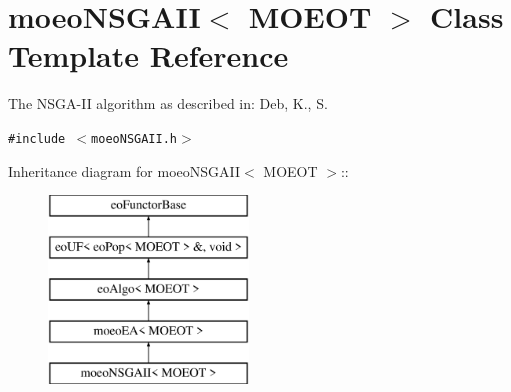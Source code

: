 \section{moeo\-NSGAII$<$ MOEOT $>$ Class Template Reference}
\label{classmoeoNSGAII}
The NSGA-II algorithm as described in: Deb, K., S.  


{\tt \#include $<$moeo\-NSGAII.h$>$}

Inheritance diagram for moeo\-NSGAII$<$ MOEOT $>$::\begin{figure}[H]
\begin{center}
\leavevmode
\includegraphics[height=5cm]{classmoeoNSGAII}
\end{center}
\end{figure}
